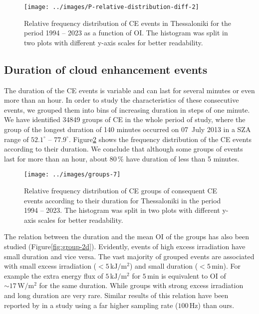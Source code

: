 \documentclass[preprint, 5p,
authoryear]{elsarticle} %
\begin{document}
\begin{figure}

{\centering \texttt{[image: ../images/P-relative-distribution-diff-2]} 

}

\caption{Relative frequency distribution of CE events in Thessaloniki for the period 1994 -- 2023 as a function of OI. The histogram was split in two plots with different y-axis scales for better readability.}\label{fig:ovir-distribution}
\end{figure}

\hypertarget{duration-of-cloud-enhancement-events}{%
\subsection{Duration of cloud enhancement
events}\label{duration-of-cloud-enhancement-events}}

The duration of the CE events is variable and can last for several
minutes or even more than an hour. In order to study the characteristics
of these consecutive events, we grouped them into bins of increasing
duration in steps of one minute. We have identified 34849 groups of CE
in the whole period of study, where the group of the longest duration of
140 minutes occurred on 07~July 2013 in a SZA range of \(52.1^\circ\) --
\(77.9^\circ\). Figure\nobreakspace{}\ref{fig:ceg-duration-distribution}
shows the frequency distribution of the CE events according to their
duration. We conclude that although some groups of events last for more
than an hour, about \(80\,\%\) have duration of less than 5 minutes.

\begin{figure}

{\centering \texttt{[image: ../images/groups-7]} 

}

\caption{Relative frequency distribution of CE groups of consequent CE events according to their duration for Thessaloniki in the period 1994 -- 2023. The histogram was split in two plots with different y-axis scales for better readability.}\label{fig:ceg-duration-distribution}
\end{figure}

The relation between the duration and the mean OI of the groups has also
been studied (Figure\nobreakspace{}\ref{fig:group-2d}). Evidently,
events of high excess irradiation have small duration and vice versa.
The vast majority of grouped events are associated with small excess
irradiation (\(<5\,\text{kJ}/\text{m}^2\)) and small duration
(\(<5\,\text{min}\)). For example the extra energy flux of
\(5\,\text{kJ}/\text{m}^2\) for \(5\,\text{min}\) is equivalent to OI of
\(\sim17\,\text{W}/\text{m}^2\) for the same duration. While groups with
strong excess irradiation and long duration are very rare. Similar
results of this relation have been reported by \citet{Zhang2018} in a
study using a far higher sampling rate (\(100\,\text{Hz}\)) than ours.
\end{document}
